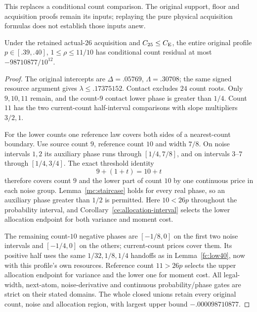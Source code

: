 This replaces a conditional count comparison. The original support,
floor and acquisition proofs remain its inputs; replaying the pure
physical acquisition formulas does not establish those inputs anew.

\begin{lemma}\label{fc:low39}
Under the retained actual-$26$ acquisition and $C_{25}\le C_{\mathrm E}$,
the entire original profile $p\in[.39,.40]$, $1\le\rho\le11/10$
has conditional count residual at most $-98710877/10^{12}$.
\end{lemma}
\begin{proof}
The original intercepts are $\Delta=.05769$, $\Lambda=.30708$;
the same signed resource argument gives $\lambda\le .17375152$.
Contact excludes $24$ count roots. Only $9,10,11$ remain, and
the count-$9$ contact lower phase is greater than $1/4$.
Count $11$ has the two current-count half-interval comparisons
with slope multipliers $3/2,1$.

For the lower counts one reference law covers both sides of a
nearest-count boundary. Use source count $9$, reference count $10$
and width $7/8$. On noise intervals $1,2$ its auxiliary phase runs
through $[1/4,7/8]$, and on intervals $3$--$7$ through $[1/4,3/4]$.
The exact threshold identity
\[
 9+(1+t)=10+t
\]
therefore covers count $9$ and the lower part of count $10$ by
one continuous price in each noise group. Lemma~\ref{mc:staircase}
holds for every real phase, so an auxiliary phase greater than
$1/2$ is permitted. Here $10<26p$ throughout the probability
interval, and Corollary~\ref{ce:allocation-interval} selects the
lower allocation endpoint for both variance and moment cost.

The remaining count-$10$ negative phases are $[-1/8,0]$ on
the first two noise intervals and $[-1/4,0]$ on the others;
current-count prices cover them. Its positive half uses the
same $1/32,1/8,1/4$ handoffs as in Lemma~\ref{fc:low40}, now
with this profile's own resources. Reference count $11>26p$
selects the upper allocation endpoint for variance and the lower
one for moment cost. All legal-width, next-atom, noise-derivative
and continuous probability/phase gates are strict on their stated
domains. The whole closed unions retain every original count,
noise and allocation region, with largest upper bound
$-.000098710877$.
\end{proof}

